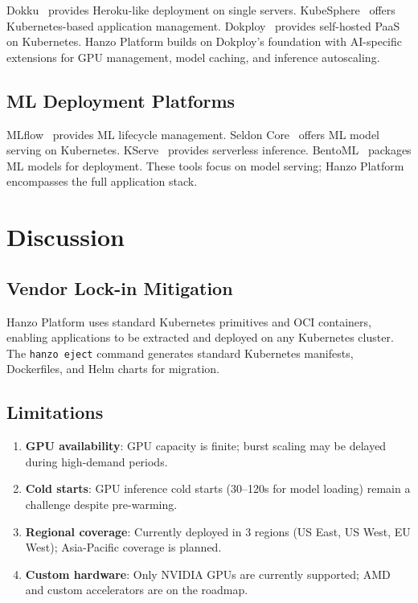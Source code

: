 \documentclass[11pt,twocolumn]{article}
\begin{document}
Dokku~\cite{dokku2013} provides Heroku-like deployment on single servers. KubeSphere~\cite{kubesphere2020} offers Kubernetes-based application management. Dokploy~\cite{dokploy2024} provides self-hosted PaaS on Kubernetes. Hanzo Platform builds on Dokploy's foundation with AI-specific extensions for GPU management, model caching, and inference autoscaling.

\subsection{ML Deployment Platforms}

MLflow~\cite{mlflow2018} provides ML lifecycle management. Seldon Core~\cite{seldon2019} offers ML model serving on Kubernetes. KServe~\cite{kserve2021} provides serverless inference. BentoML~\cite{bentoml2022} packages ML models for deployment. These tools focus on model serving; Hanzo Platform encompasses the full application stack.

\section{Discussion}
\label{sec:discussion}

\subsection{Vendor Lock-in Mitigation}

Hanzo Platform uses standard Kubernetes primitives and OCI containers, enabling applications to be extracted and deployed on any Kubernetes cluster. The \texttt{hanzo eject} command generates standard Kubernetes manifests, Dockerfiles, and Helm charts for migration.

\subsection{Limitations}

\begin{enumerate}[leftmargin=1.4em]
    \item \textbf{GPU availability}: GPU capacity is finite; burst scaling may be delayed during high-demand periods.
    \item \textbf{Cold starts}: GPU inference cold starts (30--120s for model loading) remain a challenge despite pre-warming.
    \item \textbf{Regional coverage}: Currently deployed in 3 regions (US East, US West, EU West); Asia-Pacific coverage is planned.
    \item \textbf{Custom hardware}: Only NVIDIA GPUs are currently supported; AMD and custom accelerators are on the roadmap.
\end{enumerate}
\end{document}
